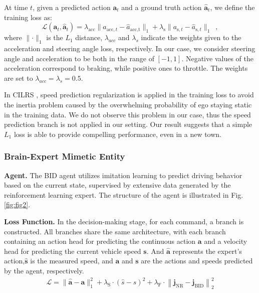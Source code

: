 At time $t$, given a predicted action $\mathbf{a}_{t}$ and a ground truth action $\hat{\mathbf{a}}_{t}$, we define the training loss as:
\begin{equation}\label{eq:loss}
	\mathcal{L}(\mathbf{a}_t, \hat{\mathbf{a}}_t) = \lambda_{\text{acc}}\lVert a_{\text{acc},t}-\hat{a}_{\text{acc,t}}\rVert_{1} + \lambda_{\text{s}} \lVert a_{\text{s},t}-\hat{a}_{\text{s},t} \rVert_{1} \enspace ,
\end{equation}
where $\lVert\cdot\rVert_{1}$ is the $L_1$ distance, $\lambda_{acc}$ and $\lambda_s$ indicate the weights given to the acceleration and steering angle loss, respectively. 
In our case, we consider steering angle and acceleration to be both in the range of $[-1, 1]$. 
Negative values of the acceleration correspond to braking, while positive ones to throttle.
The weights are set to $\lambda_{acc} = \lambda_{s} = 0.5$. 


In CILRS \cite{Codevilla:2019}, speed prediction regularization is applied in the training loss to avoid the inertia problem caused by the overwhelming probability of ego staying static in the training data. 
We do not observe this problem in our case, thus the speed prediction branch is not applied in our setting. 
Our result suggests that a simple $L_1$ loss is able to provide compelling performance, even in a new town.


\subsubsection{Brain-Expert Mimetic Entity}

\hspace{1pc}\textbf{\textsf{Agent.}} The BID agent utilizes imitation learning to predict driving behavior based on the current state, supervised by extensive data generated by the reinforcement learning expert. The structure of the agent is illustrated in Fig. \ref{fig:fig2}.

\textbf{\textsf{Loss Function.}} In the decision-making stage, for each command, a branch is constructed. All branches share the same architecture, with each branch containing an action head for predicting the continuous action $\mathbf{a}$ and a velocity head for predicting the current vehicle speed $\mathbf{s}$. And $\mathbf{\hat{a}}$ represents the expert's action,$\mathbf{\hat{s}}$ is the measured speed, and $\mathbf{a}$ and $\mathbf{s}$ are the actions and speeds predicted by the agent, respectively. 
\begin{align}
   \mathcal{L} = \|\hat{\mathbf{a}}-\mathbf{a}\|_{1}^{2} + \lambda_{\mathrm{S}} \cdot (\hat{s}-s)^{2} + \lambda_{\mathrm{F}} \cdot \left\| \mathbf{j}_{\mathrm{NR}}-\mathbf{j}_{\mathrm{BID}} \right\|_{2}^{2}
\end{align}

